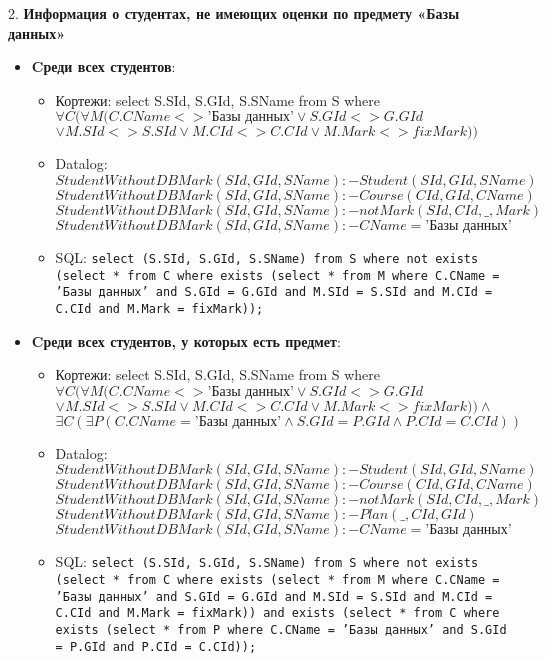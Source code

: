 \documentclass[11pt,a4paper,oneside]{article}
\begin{document}
2. \textbf{Информация о студентах, не имеющих оценки по предмету «Базы данных»}
\begin{itemize}
\item \textbf{Cреди всех студентов}:
  \begin{itemize}
  \item Кортежи: select S.SId, S.GId, S.SName from S where $\forall C (\forall M ( C.CName <> \mbox{'Базы данных'} \lor S.GId <> G.GId$ $\lor M.SId <> S.SId \lor M.CId <> C.CId \lor M.Mark <> fixMark))$
  \item Datalog: 
  $StudentWithoutDBMark(SId, GId, SName) :- Student(SId, GId, SName)$
  \newline
  $StudentWithoutDBMark(SId, GId, SName) :- Course(CId, GId, CName)$
  \newline
  $StudentWithoutDBMark(SId, GId, SName) :- not Mark(SId, CId, \_, Mark)$
  \newline
  $StudentWithoutDBMark(SId, GId, SName) :- CName = \mbox{'Базы данных'}$

  \item SQL: \texttt{select (S.SId, S.GId, S.SName) from S where not exists (select * from C where exists (select * from M where C.CName = 'Базы данных' and S.GId = G.GId and M.SId = S.SId and M.CId = C.CId and M.Mark = fixMark));}
  \end{itemize}
\item \textbf{Cреди всех студентов, у которых есть предмет}:
  \begin{itemize}
  \item Кортежи: select S.SId, S.GId, S.SName from S where $\forall C (\forall M ( C.CName <> \mbox{'Базы данных'} \lor S.GId <> G.GId$ $\lor M.SId <> S.SId \lor M.CId <> C.CId \lor M.Mark <> fixMark)) \land$ $\exists C (\exists P (C.CName = \mbox{'Базы данных'} \land S.GId = P.GId \land P.CId = C.CId))$
  \item Datalog:  
  $StudentWithoutDBMark(SId, GId, SName) :- Student(SId, GId, SName)$
  \newline
  $StudentWithoutDBMark(SId, GId, SName) :- Course(CId, GId, CName)$
  \newline
  $StudentWithoutDBMark(SId, GId, SName) :- not Mark(SId, CId, \_, Mark)$
  \newline
  $StudentWithoutDBMark(SId, GId, SName) :- Plan(\_, CId, GId)$
  \newline
  $StudentWithoutDBMark(SId, GId, SName) :- CName = \mbox{'Базы данных'}$

  \item SQL: \texttt{select (S.SId, S.GId, S.SName) from S where not exists (select * from C where exists (select * from M where C.CName = 'Базы данных' and S.GId = G.GId and M.SId = S.SId and M.CId = C.CId and M.Mark = fixMark)) and exists (select * from C where exists (select * from P where C.CName = 'Базы данных' and S.GId = P.GId and P.CId = C.CId));}
  \end{itemize}
\end{itemize}
\end{document}

